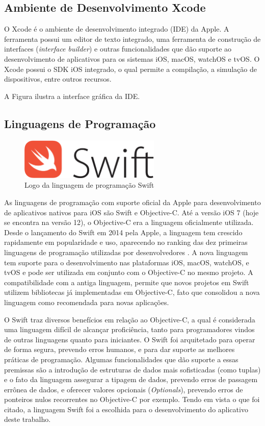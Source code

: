 \subsection{Ambiente de Desenvolvimento Xcode}
O Xcode é o ambiente de desenvolvimento integrado (IDE) da Apple. A ferramenta possui um editor de texto integrado, uma ferramenta de construção de interfaces (\textit{interface builder}) e outras funcionalidades que dão suporte ao desenvolvimento de aplicativos para os sistemas iOS, macOS, watchOS e tvOS. O Xcode possui o SDK iOS integrado, o qual permite a compilação, a simulação de dispositivos, entre outros recursos.

A Figura  ilustra a interface gráfica da IDE.

\subsection{Linguagens de Programação}
\begin{figure}[h]
    \centering
    \includegraphics[width=0.6\textwidth]{pfc/figuras/swift.png}
    \caption{Logo da linguagem de programação Swift}
    \label{fig:swift}
\end{figure}
As linguagens de programação com suporte oficial da Apple para desenvolvimento de aplicativos nativos para iOS são Swift e Objective-C. Até a versão iOS 7 (hoje se encontra na versão 12), o Objective-C era a linguagem oficialmente utilizada. Desde o lançamento do Swift em 2014 pela Apple, a linguagem tem crescido rapidamente em popularidade e uso, aparecendo no ranking das dez primeiras linguagens de programação utilizadas por desenvolvedores . A nova linguagem tem suporte para o desenvolvimento nas plataformas iOS, macOS, watchOS, e tvOS e pode ser utilizada em conjunto com o Objective-C no mesmo projeto. A compatibilidade com a antiga linguagem, permite que novos projetos em Swift utilizem bibliotecas já implementadas em Objective-C, fato que consolidou a nova linguagem como recomendada para novas aplicações.

O Swift traz diversos benefícios em relação ao Objective-C, a qual é considerada uma linguagem difícil de alcançar proficiência, tanto para programadores vindos de outras linguagens quanto para iniciantes. O Swift foi arquitetado para operar de forma segura, prevendo erros humanos, e para dar suporte as melhores práticas de programação. Algumas funcionalidades que dão suporte a essas premissas são a introdução de estruturas de dados mais sofisticadas (como tuplas) e o fato da linguagem assegurar a tipagem de dados, prevendo erros de passagem errônea de dados, e oferecer valores opcionais (\textit{Optionals}), prevendo erros de ponteiros nulos recorrentes no Objective-C por exemplo. Tendo em vista o que foi citado, a linguagem Swift foi a escolhida para o desenvolvimento do aplicativo deste trabalho.

